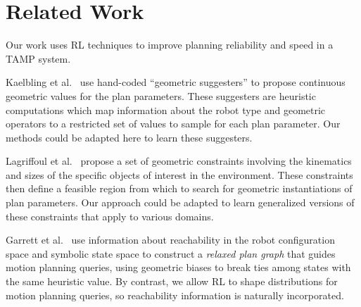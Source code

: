 \section{Related Work}
Our work uses RL techniques to improve planning reliability and speed in a TAMP system.

Kaelbling et al.~\cite{kaelbling2011hierarchical} use hand-coded ``geometric suggesters'' to propose
continuous geometric values for the plan parameters. These suggesters are heuristic
computations which map information about the robot type and geometric operators to a restricted
set of values to sample for each plan parameter. Our methods could be adapted here to learn these
suggesters.

Lagriffoul et al.~\cite{lagriffoul2014orientation}
propose a set of geometric constraints involving the kinematics and sizes of the specific objects of
interest in the environment. These constraints then define a feasible region from which to search
for geometric instantiations of plan parameters. Our approach could be adapted to learn generalized
versions of these constraints that apply to various domains.

Garrett et al.~\cite{GarrettWAFR14} use information about reachability in the robot configuration
space and symbolic state space to construct a \emph{relaxed plan graph} that guides motion
planning queries, using geometric biases to break ties among states with the same heuristic value.
By contrast, we allow RL to shape distributions for motion planning queries, so reachability information
is naturally incorporated.





